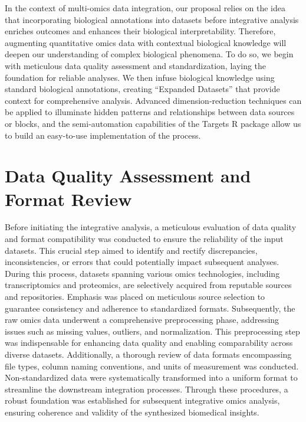\documentclass[a4paper, nobind]{templates/ociamthesis}
\renewcommand{\chaptermark}[1]{\markboth{\thechapter. #1}{\thechapter. #1}}
\begin{document}
\chaptermark{Methodology}

\minitoc 

In the context of multi-omics data integration, our proposal relies on the idea that incorporating biological annotations into datasets before integrative analysis enriches outcomes and enhances their biological interpretability. Therefore, augmenting quantitative omics data with contextual biological knowledge will deepen our understanding of complex biological phenomena. To do so, we begin with meticulous data quality assessment and standardization, laying the foundation for reliable analyses. We then infuse biological knowledge using standard biological annotations, creating ``Expanded Datasets'' that provide context for comprehensive analysis. Advanced dimension-reduction techniques can be applied to illuminate hidden patterns and relationships between data sources or blocks, and the semi-automation capabilities of the Targets R package allow us to build an easy-to-use implementation of the process.

\hypertarget{qa}{%
\section{Data Quality Assessment and Format Review}\label{qa}}

Before initiating the integrative analysis, a meticulous evaluation of data quality and format compatibility was conducted to ensure the reliability of the input datasets. This crucial step aimed to identify and rectify discrepancies, inconsistencies, or errors that could potentially impact subsequent analyses. During this process, datasets spanning various omics technologies, including transcriptomics and proteomics, are selectively acquired from reputable sources and repositories. Emphasis was placed on meticulous source selection to guarantee consistency and adherence to standardized formats. Subsequently, the raw omics data underwent a comprehensive preprocessing phase, addressing issues such as missing values, outliers, and normalization. This preprocessing step was indispensable for enhancing data quality and enabling comparability across diverse datasets. Additionally, a thorough review of data formats encompassing file types, column naming conventions, and units of measurement was conducted. Non-standardized data were systematically transformed into a uniform format to streamline the downstream integration processes. Through these procedures, a robust foundation was established for subsequent integrative omics analysis, ensuring coherence and validity of the synthesized biomedical insights.
\end{document}
